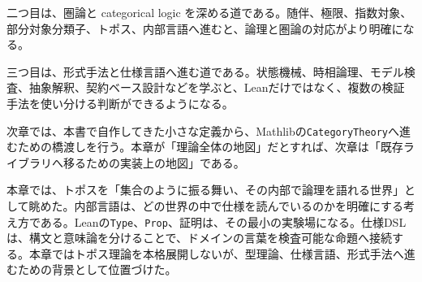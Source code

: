 二つ目は、圏論と categorical logic を深める道である。随伴、極限、指数対象、部分対象分類子、トポス、内部言語へ進むと、論理と圏論の対応がより明確になる。

三つ目は、形式手法と仕様言語へ進む道である。状態機械、時相論理、モデル検査、抽象解釈、契約ベース設計などを学ぶと、Leanだけではなく、複数の検証手法を使い分ける判断ができるようになる。

次章では、本書で自作してきた小さな定義から、Mathlibの\texttt{CategoryTheory}へ進むための橋渡しを行う。本章が「理論全体の地図」だとすれば、次章は「既存ライブラリへ移るための実装上の地図」である。

本章では、トポスを「集合のように振る舞い、その内部で論理を語れる世界」として眺めた。内部言語は、どの世界の中で仕様を読んでいるのかを明確にする考え方である。Leanの\texttt{Type}、\texttt{Prop}、証明は、その最小の実験場になる。仕様DSLは、構文と意味論を分けることで、ドメインの言葉を検査可能な命題へ接続する。本章ではトポス理論を本格展開しないが、型理論、仕様言語、形式手法へ進むための背景として位置づけた。
